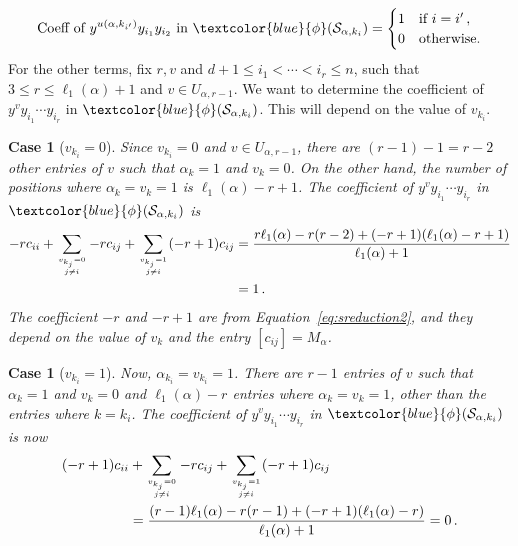 \documentclass[10pt,a4paper]{article}
\newcommand{\blue}[1]{\textcolor{blue}{#1}}
\newcounter{casecount}  \setcounter{casecount}{0}
\newtheorem{case}[casecount]{Case}
\begin{document}
\begin{equation}\label{eq:coefr=2}
  \text{Coeff  of } y^{u(\alpha, k_{i'})} y_{i_1} y_{i_2} \text{ in  } \blue{\phi} (\mathcal{S}_{\alpha, k_{i}})  = 
  \begin{cases}
  	1 &\text{if } i=i'\,,\\
	0& \text{otherwise.}
  \end{cases}
  \end{equation}
For the other terms, fix $r, v$ and $d+1 \leq i_1 < \cdots < i_r \leq n$, such that $3 \leq r \leq \ell_1(\alpha)+1$ and  $v \in U_{\alpha,r-1}$.
We want to determine the coefficient of $y^{v} y_{i_1} \cdots y_{i_{r}}$ in $\blue{\phi} (\mathcal{S}_{\alpha, k_{i}}) $. This will depend on the value of $v_{k_i}$.

\begin{case}[{\it $v_{k_i}=0$}\null] \label{vk=0} 
Since $v_{k_i}=0$ and $v \in U_{\alpha,r-1}$, there are $(r-1)-1=r-2$ other entries of $v$ such that $\alpha_k=1$ and $v_k=0$.
On the other hand, the number of positions where $\alpha_k=v_k=1$ is $\ell_1(\alpha)-r+1$.
The coefficient of $y^{v} y_{i_1} \cdots y_{i_{r}}$ in $\blue{\phi} (\mathcal{S}_{\alpha, k_{i}}) $ is
\begin{align*}
 -rc_{ii}  + \sum_{v_{k_j}=0 \atop j\ne i}  -rc_{ij}   + \sum_{v_{k_j}=1 \atop j\ne i}  (-r+1)c_{ij}  
    &= \frac{r\ell_1(\alpha) -r(r-2) + (-r+1)(\ell_1(\alpha)-r+1)}{\ell_1(\alpha)+1} \\
    &= 1\,.
 \end{align*}
 The coefficient $-r$ and $-r+1$ are from Equation~\eqref{eq:sreduction2}, and they depend on the value of $v_k$ and the entry $[c_{ij}]=M_\alpha$.
\end{case} 

\begin{case}[{\it $v_{k_i}=1$}\null] \label{vk=1} 
Now, $\alpha_{k_i}=v_{k_i}=1$. There are $r-1$ entries of $v$ such that $\alpha_k=1$ and $v_k=0$
and $\ell_1(\alpha)-r$ entries where $\alpha_k=v_k=1$, other than the entries where $k=k_i$.
The coefficient of $y^{v} y_{i_1} \cdots y_{i_{r}}$ in $\blue{\phi} (\mathcal{S}_{\alpha, k_{i}}) $ is now
\begin{align*}
 (-r+1)c_{ii}  &+ \sum_{v_{k_j}=0 \atop j\ne i}  -rc_{ij}   + \sum_{v_{k_j}=1 \atop j\ne i}  (-r+1)c_{ij}  \\
    &= \frac{(r-1)\ell_1(\alpha) -r(r-1) + (-r+1)(\ell_1(\alpha)-r)}{\ell_1(\alpha)+1} 
    = 0\,.
 \end{align*}
\end{case}
 
\end{document}
